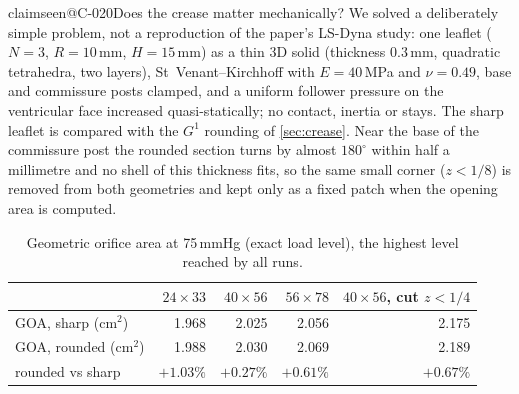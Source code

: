 \documentclass[11pt,a4paper]{article}
\makeatletter
\theoremstyle{plain}
\theoremstyle{remark}
\newcommand{\claim}[1]{\ifcsname claimseen@#1\endcsname\else\expandafter\gdef\csname claimseen@#1\endcsname{}\label{claim:#1}\fi}
\makeatother
\begin{document}
\claim{C-020}Does the crease matter mechanically? We solved a deliberately simple problem, not a reproduction of the
paper's LS-Dyna study: one leaflet ($N=3$, $R=10$\,mm, $H=15$\,mm) as a thin 3D solid (thickness $0.3$\,mm, quadratic
tetrahedra, two layers), St~Venant--Kirchhoff with $E=40$\,MPa and $\nu=0.49$, base and commissure posts clamped, and a
uniform follower pressure on the ventricular face increased quasi-statically; no contact, inertia or stays. The sharp
leaflet is compared with the $G^1$ rounding of \cref{sec:crease}. Near the base of the commissure post the rounded section
turns by almost $180^\circ$ within half a millimetre and no shell of this thickness fits, so the same small corner
($z<1/8$) is removed from both geometries and kept only as a fixed patch when the opening area is computed.

\begin{table}[t]\centering\small
\begin{tabular}{lrrrr}\toprule
 & $24\times33$ & $40\times56$ & $56\times78$ & $40\times56$, cut $z<1/4$\\\midrule
GOA, sharp (cm$^2$) & 1.968 & 2.025 & 2.056 & 2.175\\
GOA, rounded (cm$^2$) & 1.988 & 2.030 & 2.069 & 2.189\\
rounded vs sharp & $+1.03\%$ & $+0.27\%$ & $+0.61\%$ & $+0.67\%$\\\bottomrule
\end{tabular}
\caption{Geometric orifice area at 75\,mmHg (exact load level), the highest level reached by all runs.}
\label{tab:fem}
\end{table}
\end{document}
